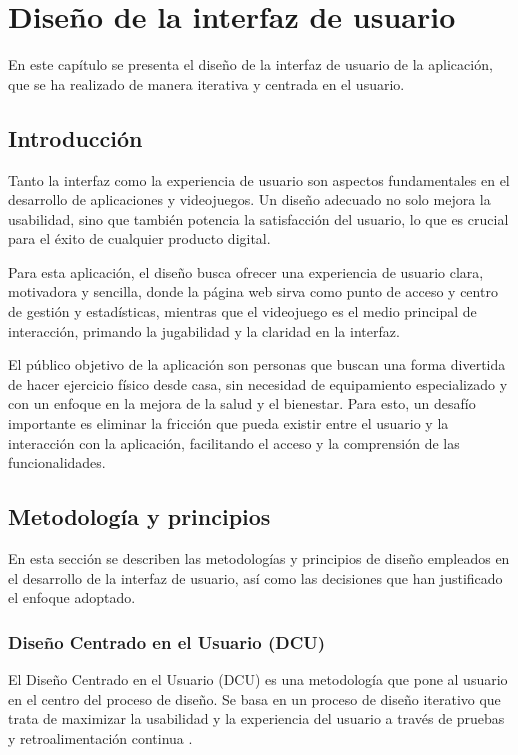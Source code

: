 \chapter{Diseño de la interfaz de usuario}
\label{anexo2:cap:diseno-interfaz-usuario}
En este capítulo se presenta el diseño de la interfaz de usuario de la
aplicación, que se ha realizado de manera iterativa y centrada en el usuario.

\section{Introducción}
\label{anexo2:sec:diseno-introduccion}
Tanto la interfaz como la experiencia de usuario son aspectos fundamentales en
el desarrollo de aplicaciones y videojuegos. Un diseño adecuado no solo mejora
la usabilidad, sino que también potencia la satisfacción del usuario, lo que es
crucial para el éxito de cualquier producto digital.

Para esta aplicación, el diseño busca ofrecer una experiencia de usuario clara,
motivadora y sencilla, donde la página web sirva como punto de acceso y centro
de gestión y estadísticas, mientras que el videojuego es el medio principal de
interacción, primando la jugabilidad y la claridad en la interfaz.

El público objetivo de la aplicación son personas que buscan una forma divertida
de hacer ejercicio físico desde casa, sin necesidad de equipamiento
especializado y con un enfoque en la mejora de la salud y el bienestar. Para
esto, un desafío importante es eliminar la fricción que pueda existir entre el
usuario y la interacción con la aplicación, facilitando el acceso y la
comprensión de las funcionalidades.

\section{Metodología y principios}
\label{anexo2:sec:diseno-metodologia}
En esta sección se describen las metodologías y principios de diseño empleados
en el desarrollo de la interfaz de usuario, así como las decisiones que han
justificado el enfoque adoptado.

\subsection{Diseño Centrado en el Usuario (DCU)}
El Diseño Centrado en el Usuario (DCU) es una metodología que pone al usuario en
el centro del proceso de diseño. Se basa en un proceso de diseño iterativo que
trata de maximizar la usabilidad y la experiencia del usuario a través de
pruebas y retroalimentación continua \parencites{UCDIDF2025Mar}{UCDW3C2008Apr}%
{UCDUsal}.

